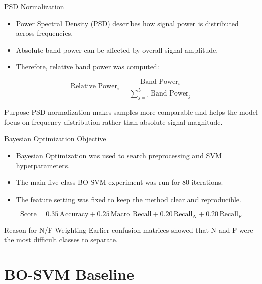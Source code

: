 \documentclass[10pt,aspectratio=169]{beamer}
\begin{document}
\begin{frame}{PSD Normalization}
  \begin{itemize}
    \item Power Spectral Density (PSD) describes how signal power is distributed across frequencies.
    \item Absolute band power can be affected by overall signal amplitude.
    \item Therefore, relative band power was computed:
  \end{itemize}

  \[
    \text{Relative Power}_{i} =
    \frac{\text{Band Power}_{i}}
    {\sum_{j=1}^{5}\text{Band Power}_{j}}
  \]

  \begin{block}{Purpose}
    PSD normalization makes samples more comparable and helps the model focus on frequency distribution rather than absolute signal magnitude.
  \end{block}
\end{frame}

\begin{frame}{Bayesian Optimization Objective}
  \begin{itemize}
    \item Bayesian Optimization was used to search preprocessing and SVM hyperparameters.
    \item The main five-class BO-SVM experiment was run for 80 iterations.
    \item The feature setting was fixed to keep the method clear and reproducible.
  \end{itemize}

  \[
    \text{Score} =
    0.35\,\text{Accuracy}
    + 0.25\,\text{Macro Recall}
    + 0.20\,\text{Recall}_{N}
    + 0.20\,\text{Recall}_{F}
  \]

  \begin{block}{Reason for N/F Weighting}
    Earlier confusion matrices showed that N and F were the most difficult classes to separate.
  \end{block}
\end{frame}

\section{BO-SVM Baseline}
\end{document}

